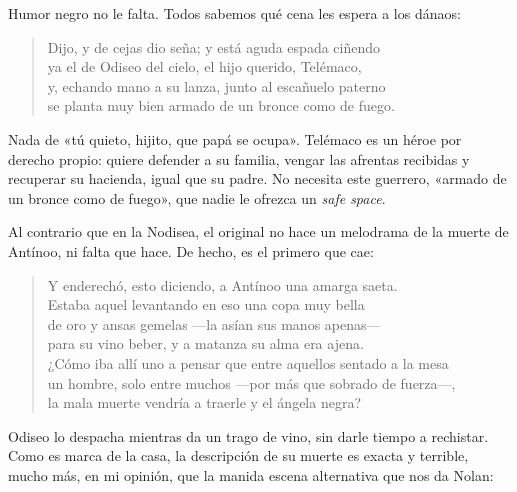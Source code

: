 Humor negro no le falta. Todos sabemos qué cena les espera a los dánaos:

\begin{verse}
Dijo, y de cejas dio seña; y está aguda espada ciñendo\\
ya el de Odiseo del cielo, el hijo querido, Telémaco,\\
y, echando mano a su lanza, junto al escañuelo paterno\\
se planta muy bien armado de un bronce como de fuego.
\end{verse}

Nada de «tú quieto, hijito, que papá se ocupa». Telémaco es un héroe por derecho propio: quiere defender a su familia, vengar las afrentas recibidas y recuperar su hacienda, igual que su padre. No necesita este guerrero, «armado de un bronce como de fuego», que nadie le ofrezca un \emph{safe space}.

Al contrario que en la Nodisea, el original no hace un melodrama de la muerte de Antínoo, ni falta que hace. De hecho, es el primero que cae:

\begin{verse}
Y enderechó, esto diciendo, a Antínoo una amarga saeta.\\
Estaba aquel levantando en eso una copa muy bella\\
de oro y ansas gemelas ---la asían sus manos apenas---\\
para su vino beber, y a matanza su alma era ajena.\\
¿Cómo iba allí uno a pensar que entre aquellos sentado a la mesa\\
un hombre, solo entre muchos ---por más que sobrado de fuerza---,\\
la mala muerte vendría a traerle y el ángela negra?
\end{verse}

Odiseo lo despacha mientras da un trago de vino, sin darle tiempo a rechistar. Como es marca de la casa, la descripción de su muerte es exacta y terrible, mucho más, en mi opinión, que la manida escena alternativa que nos da Nolan:

